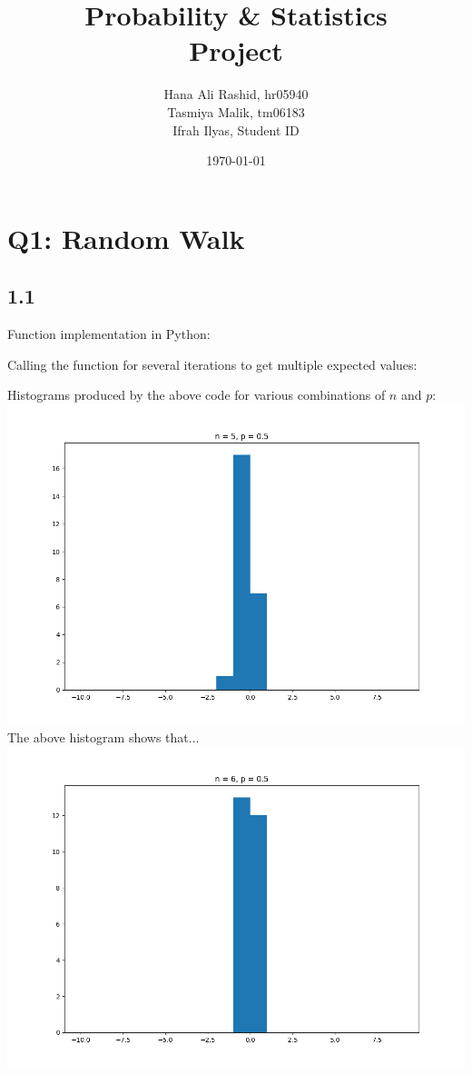 \documentclass[answers]{exam}
\title{Probability \& Statistics\\ Project}
\author{Hana Ali Rashid, hr05940\\ Tasmiya Malik, tm06183\\ Ifrah Ilyas, Student ID}
\date{\today{}}
\begin{document}
\maketitle



\section*{Q1: Random Walk}
\subsection*{1.1}
Function implementation in Python:

Calling the function for several iterations to get multiple expected values:

\pagebreak
Histograms produced by the above code for various combinations of $n$ and $p$:\\
\includegraphics[scale = 0.7]{Q1_histograms/q1n = 5, p = 0.5.png}\\
The above histogram shows that...\\
\includegraphics[scale = 0.7]{Q1_histograms/q1n = 6, p = 0.5.png}\\
\end{document}
